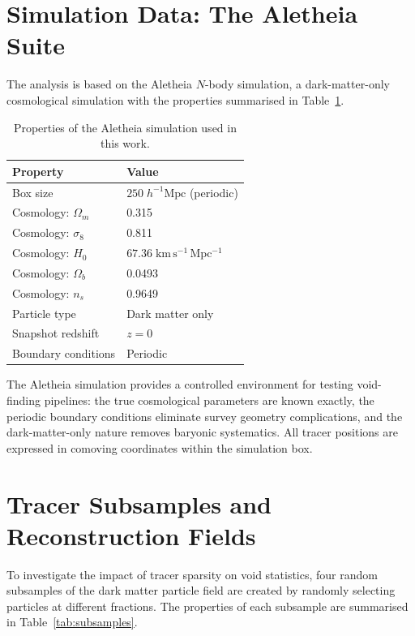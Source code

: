 \documentclass[12pt]{report}
\begin{document}
\section{Simulation Data: The Aletheia Suite}
\label{sec:aletheia}

The analysis is based on the Aletheia $N$-body simulation, a dark-matter-only cosmological simulation with the properties summarised in Table~\ref{tab:aletheia}.

\begin{table}[H]
    \centering
    \caption{Properties of the Aletheia simulation used in this work.}
    \label{tab:aletheia}
    \begin{tabular}{ll}
        \toprule
        \textbf{Property} & \textbf{Value} \\
        \midrule
        Box size           & $250\;h^{-1}\mathrm{Mpc}$ (periodic) \\
        Cosmology: $\Omega_m$ & 0.315 \\
        Cosmology: $\sigma_8$ & 0.811 \\
        Cosmology: $H_0$   & $67.36\;\mathrm{km\,s^{-1}\,Mpc^{-1}}$ \\
        Cosmology: $\Omega_b$ & 0.0493 \\
        Cosmology: $n_s$   & 0.9649 \\
        Particle type      & Dark matter only \\
        Snapshot redshift  & $z = 0$ \\
        Boundary conditions & Periodic \\
        \bottomrule
    \end{tabular}
\end{table}

The Aletheia simulation provides a controlled environment for testing void-finding pipelines: the true cosmological parameters are known exactly, the periodic boundary conditions eliminate survey geometry complications, and the dark-matter-only nature removes baryonic systematics. All tracer positions are expressed in comoving coordinates within the simulation box.


\section{Tracer Subsamples and Reconstruction Fields}
\label{sec:tracers}

To investigate the impact of tracer sparsity on void statistics, four random subsamples of the dark matter particle field are created by randomly selecting particles at different fractions. The properties of each subsample are summarised in Table~\ref{tab:subsamples}.
\end{document}
